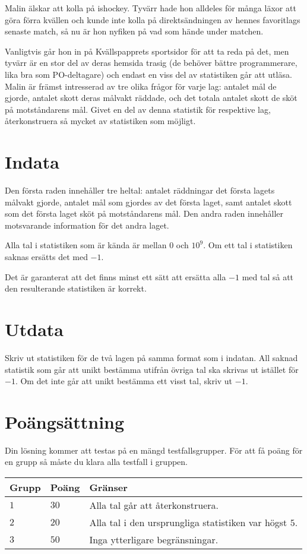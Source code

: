 Malin älskar att kolla på ishockey.
Tyvärr hade hon alldeles för många läxor att göra förra kvällen och kunde inte kolla på direktsändningen av hennes favoritlags senaste match, så nu är hon nyfiken på vad som hände under matchen.

Vanligtvis går hon in på Kvällspapprets sportsidor för att ta reda på det, men tyvärr är en stor del av deras hemsida trasig (de behöver bättre programmerare, lika bra som PO-deltagare) och endast en viss del av statistiken går att utläsa.
Malin är främst intresserad av tre olika frågor för varje lag: antalet mål de gjorde, antalet skott deras målvakt räddade, och det totala antalet skott de sköt på motståndarens mål.
Givet en del av denna statistik för respektive lag, återkonstruera så mycket av statistiken som möjligt.

\section*{Indata}
Den första raden innehåller tre heltal: antalet räddningar det första lagets målvakt gjorde, antalet mål som gjordes av det första laget, samt antalet skott som det första laget sköt på motståndarens mål.
Den andra raden innehåller motsvarande information för det andra laget.

Alla tal i statistiken som är kända är mellan $0$ och $10^9$.
Om ett tal i statistiken saknas ersätts det med $-1$.

Det är garanterat att det finns minst ett sätt att ersätta alla $-1$ med tal så att den resulterande statistiken är korrekt.

\section*{Utdata}
Skriv ut statistiken för de två lagen på samma format som i indatan.
All saknad statistik som går att unikt bestämma utifrån övriga tal ska skrivas ut istället för $-1$.
Om det inte går att unikt bestämma ett visst tal, skriv ut $-1$.

\section*{Poängsättning}
Din lösning kommer att testas på en mängd testfallsgrupper.
För att få poäng för en grupp så måste du klara alla testfall i gruppen.

\noindent
\begin{tabular}{| l | l | p{12cm} |}
  \hline
  \textbf{Grupp} & \textbf{Poäng} & \textbf{Gränser} \\ \hline
  $1$   & $30$       & Alla tal går att återkonstruera. \\ \hline
  $2$   & $20$       & Alla tal i den ursprungliga statistiken var högst $5$. \\ \hline
  $3$   & $50$       & Inga ytterligare begränsningar. \\ \hline
\end{tabular}

